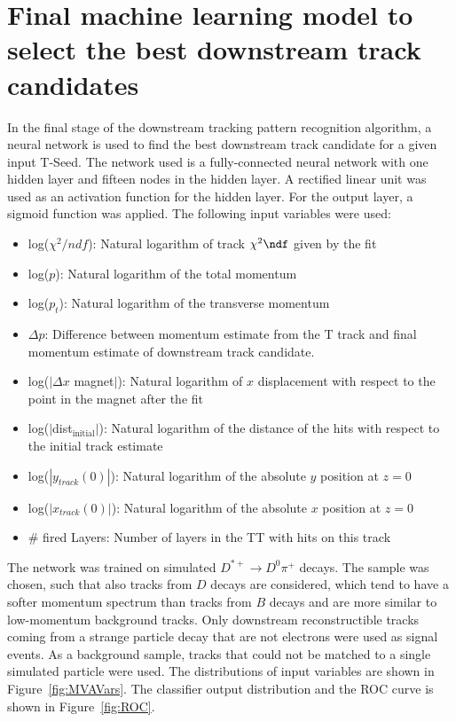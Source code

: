 \section{Final machine learning model to select the best downstream track candidates}

In the final stage of the downstream tracking pattern recognition algorithm, a neural network is used to find the best downstream track
candidate for a given input T-Seed.
 The network used is a fully-connected neural network with one hidden layer and fifteen nodes in the hidden layer. 
A rectified linear unit was used as an activation function for the hidden layer. For the output layer, a sigmoid function was applied. The following input variables were used:

\begin{itemize}
\item log($\chi^{2}/ndf$): Natural logarithm of track $\chi^{2}\ndf$
given by the fit
\item log($p$): Natural logarithm of the total momentum
\item log($p_t$): Natural logarithm of the transverse momentum
\item $\Delta p$: Difference between momentum estimate from the T track and final momentum estimate of downstream track candidate.
\item log($|\Delta x$ magnet$|$): Natural logarithm of $x$ displacement with respect to
the point in the magnet after the fit
\item log($|$dist$_{\text{initial}}|$): Natural logarithm of the distance of the hits with respect 
to the initial track estimate
\item log($|y_{track}(0)|$): Natural logarithm of the absolute $y$ position at
$z=0$
\item log($|x_{track}(0)|$): Natural logarithm of the absolute $x$ position at
$z=0$
\item \# fired Layers: Number of layers in the TT with hits on this track
\end{itemize}

The network was trained on simulated $D^{*+} \rightarrow D^{0}\pi^{+}$ decays. The sample was chosen, such that also tracks from $D$ decays are considered, which tend to have a softer momentum spectrum than tracks from $B$ 
decays and are more similar to low-momentum background tracks. Only downstream reconstructible tracks
coming from a strange particle decay that are not electrons were used as
signal events. As a background sample, 
tracks that could not be matched to a single
simulated particle were used. The distributions of input variables are shown in Figure~\ref{fig:MVAVars}. The classifier output distribution and the ROC curve is shown in Figure~\ref{fig:ROC}. 

